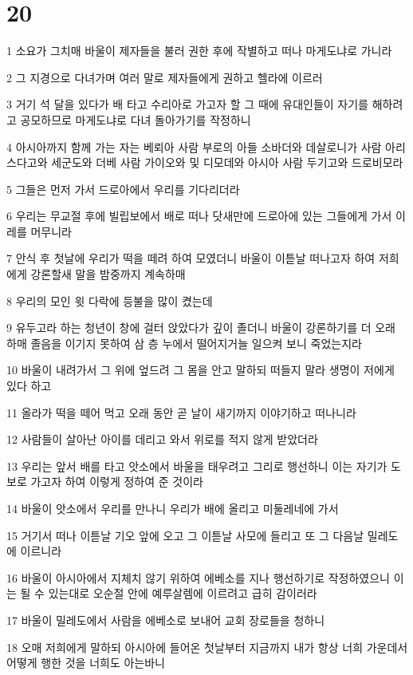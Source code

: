 \chapter{20}

\par 1 소요가 그치매 바울이 제자들을 불러 권한 후에 작별하고 떠나 마게도냐로 가니라
\par 2 그 지경으로 다녀가며 여러 말로 제자들에게 권하고 헬라에 이르러
\par 3 거기 석 달을 있다가 배 타고 수리아로 가고자 할 그 때에 유대인들이 자기를 해하려고 공모하므로 마게도냐로 다녀 돌아가기를 작정하니
\par 4 아시아까지 함께 가는 자는 베뢰아 사람 부로의 아들 소바더와 데살로니가 사람 아리스다고와 세군도와 더베 사람 가이오와 및 디모데와 아시아 사람 두기고와 드로비모라
\par 5 그들은 먼저 가서 드로아에서 우리를 기다리더라
\par 6 우리는 무교절 후에 빌립보에서 배로 떠나 닷새만에 드로아에 있는 그들에게 가서 이레를 머무니라
\par 7 안식 후 첫날에 우리가 떡을 떼려 하여 모였더니 바울이 이튿날 떠나고자 하여 저희에게 강론할새 말을 밤중까지 계속하매
\par 8 우리의 모인 윗 다락에 등불을 많이 켰는데
\par 9 유두고라 하는 청년이 창에 걸터 앉았다가 깊이 졸더니 바울이 강론하기를 더 오래 하매 졸음을 이기지 못하여 삼 층 누에서 떨어지거늘 일으켜 보니 죽었는지라
\par 10 바울이 내려가서 그 위에 엎드려 그 몸을 안고 말하되 떠들지 말라 생명이 저에게 있다 하고
\par 11 올라가 떡을 떼어 먹고 오래 동안 곧 날이 새기까지 이야기하고 떠나니라
\par 12 사람들이 살아난 아이를 데리고 와서 위로를 적지 않게 받았더라
\par 13 우리는 앞서 배를 타고 앗소에서 바울을 태우려고 그리로 행선하니 이는 자기가 도보로 가고자 하여 이렇게 정하여 준 것이라
\par 14 바울이 앗소에서 우리를 만나니 우리가 배에 올리고 미둘레네에 가서
\par 15 거기서 떠나 이튿날 기오 앞에 오고 그 이튿날 사모에 들리고 또 그 다음날 밀레도에 이르니라
\par 16 바울이 아시아에서 지체치 않기 위하여 에베소를 지나 행선하기로 작정하였으니 이는 될 수 있는대로 오순절 안에 예루살렘에 이르려고 급히 감이러라
\par 17 바울이 밀레도에서 사람을 에베소로 보내어 교회 장로들을 청하니
\par 18 오매 저희에게 말하되 아시아에 들어온 첫날부터 지금까지 내가 항상 너희 가운데서 어떻게 행한 것을 너희도 아는바니
